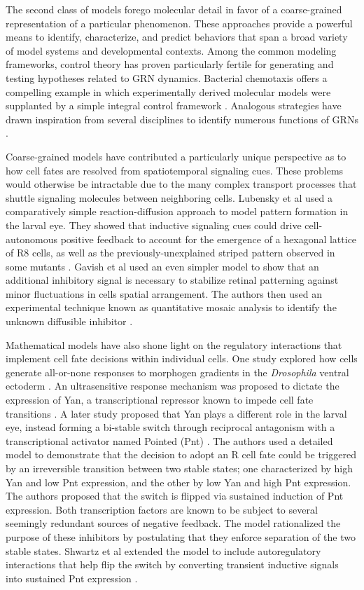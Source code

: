 The second class of models forego molecular detail in favor of a coarse-grained representation of a particular phenomenon. These approaches provide a powerful means to identify, characterize, and predict behaviors that span a broad variety of model systems and developmental contexts. Among the common modeling frameworks, control theory has proven particularly fertile for generating and testing hypotheses related to GRN dynamics. Bacterial chemotaxis offers a compelling example in which experimentally derived molecular models were supplanted by a simple integral control framework \cite{Barkai1997b,Alon1999,Yi2000,Muzzey2009}. Analogous strategies have drawn inspiration from several disciplines to identify numerous functions of GRNs \cite{Ma2009,Rahimi2016,Benzinger2018,Adler2018,Yordanov2018}.

Coarse-grained models have contributed a particularly unique perspective as to how cell fates are resolved from spatiotemporal signaling cues. These problems would otherwise be intractable due to the many complex transport processes that shuttle signaling molecules between neighboring cells. Lubensky et al used a comparatively simple reaction-diffusion approach to model pattern formation in the larval eye. They showed that inductive signaling cues could drive cell-autonomous positive feedback to account for the emergence of a hexagonal lattice of R8 cells, as well as the previously-unexplained striped pattern observed in some mutants \cite{Lubensky2011}. Gavish et al used an even simpler model to show that an additional inhibitory signal is necessary to stabilize retinal patterning against minor fluctuations in cells spatial arrangement. The authors then used an experimental technique known as quantitative mosaic analysis to identify the unknown diffusible inhibitor \cite{Gavish2016}.

Mathematical models have also shone light on the regulatory interactions that implement cell fate decisions within individual cells. One study explored how cells generate all-or-none responses to morphogen gradients in the \textit{Drosophila} ventral ectoderm \cite{Melen2005}. An ultrasensitive response mechanism was proposed to dictate the expression of Yan, a transcriptional repressor known to impede cell fate transitions \cite{Lai1992a,Rogge1995,Rebay1995}. A later study proposed that Yan plays a different role in the larval eye, instead forming a bi-stable switch through reciprocal antagonism with a transcriptional activator named Pointed (Pnt) \cite{Graham2010}. The authors used a detailed model to demonstrate that the decision to adopt an R cell fate could be triggered by an irreversible transition between two stable states; one characterized by high Yan and low Pnt expression, and the other by low Yan and high Pnt expression. The authors proposed that the switch is flipped via sustained induction of Pnt expression. Both transcription factors are known to be subject to several seemingly redundant sources of negative feedback. The model rationalized the purpose of these inhibitors by postulating that they enforce separation of the two stable states. Shwartz et al extended the model to include autoregulatory interactions that help flip the switch by converting transient inductive signals into sustained Pnt expression \cite{Shwartz2013}. 

